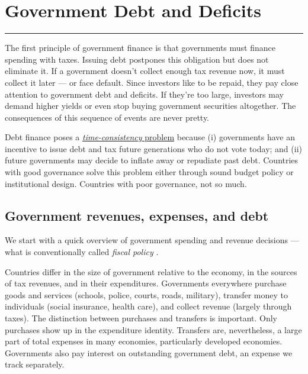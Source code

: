 \chapter{Government Debt and Deficits}\label{chp:dbdf}
\hypertarget{deficits}{}


\rule{\textwidth}{1pt}

The first principle of government finance is that
governments must finance spending with taxes.
Issuing debt postpones this obligation but does not eliminate it.
If a government doesn't collect enough tax revenue now,
it must collect it later --- or face default.
Since investors like to be repaid, they pay close attention
to government debt and deficits.
If they're too large, investors may demand higher yields or even stop buying government securities altogether.
The consequences of this sequence of events are never pretty.

Debt finance poses a \hyperref[sec:time_cons]{\textit{time-consistency} problem} because
(i) governments have an incentive to issue debt and tax future
generations who do not vote today;
and (ii) future governments may decide to inflate away
or repudiate past debt.
Countries with good governance solve this problem either through
sound budget policy or institutional design.
Countries with poor governance, not so much.


\section{Government revenues, expenses, and debt}

We start with a quick overview of
government spending and revenue decisions ---
what is conventionally called {\it fiscal policy  \/}.

Countries differ in the size of government relative to the economy,
in the sources of tax revenues,
and in their expenditures.
Governments everywhere purchase goods and services (schools, police, courts, roads, military),
transfer money to individuals (social insurance, health care),
and collect revenue (largely through taxes).
The distinction between purchases and transfers is important.
Only purchases show up in the expenditure identity.
Transfers are, nevertheless, a large part of total expenses in many economies,
particularly developed economies.
Governments also pay interest on outstanding government debt,
an expense we track separately.

